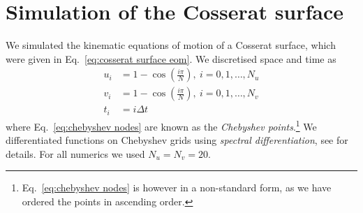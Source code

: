 \documentclass[]{cam-thesis}
\begin{document}

\section{Simulation of the Cosserat surface}

We simulated the kinematic equations of motion of a Cosserat surface, which were given in Eq.~\ref{eq:cosserat surface eom}. We discretised space and time as
\begin{subequations}
	\begin{align} 
		u_i & = 1 - \cos \left( \frac{i \pi}{N} \right),\ i = 0, 1, \dots, N_u \label{eq:chebyshev nodes} \\
		v_i & = 1 - \cos \left( \frac{i \pi}{N} \right),\ i = 0, 1, \dots, N_v  \\
		t_i & = i \Delta t
	\end{align}
\end{subequations}
where Eq.~\ref{eq:chebyshev nodes} are known as the \textit{Chebyshev points}.\footnote{Eq.~\ref{eq:chebyshev nodes} is however in a non-standard form, as we have ordered the points in ascending order.} We differentiated functions on Chebyshev grids using \textit{spectral differentiation}, see \citep{trefethen2000spectral} for details. For all numerics we used $N_u = N_v = 20$.
\end{document}
